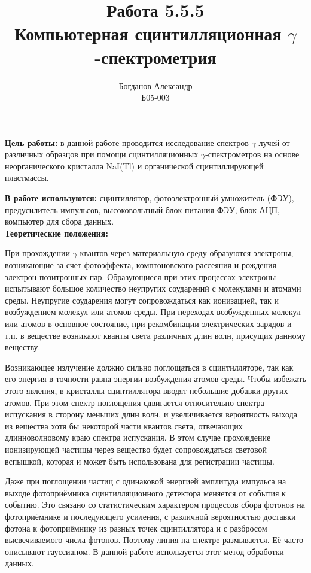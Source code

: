 \documentclass[a4paper, 12pt]{article}%
\author{Богданов Александр \\
	Б05-003}
\title{\textbf{Работа 5.5.5 \\ 
		Компьютерная сцинтилляционная $\gamma$-спектрометрия}}
\begin{document}
\maketitle

\textbf{Цель работы:} в данной работе проводится исследование спектров $\gamma$-лучей от различных образцов при помощи сцинтилляционных $\gamma$-спектрометров на основе неорганического кристалла NaI(Tl) и органической сцинтиллирующей пластмассы. 

\textbf{В работе используются:} сцинтиллятор,  фотоэлектронный умножитель (ФЭУ), предусилитель импульсов,  высоковольтный блок питания ФЭУ,  блок АЦП,  компьютер для сбора данных.\\

\textbf{Теоретические положения:}\\\par

	При прохождении $\gamma$-квантов через материальную среду образуются электроны,  возникающие за счет фотоэффекта,  комптоновского рассеяния и рождения электрон-позитронных пар.  Образующиеся при этих процессах электроны испытывают большое количество неупругих соударений с молекулами и атомами среды.  Неупругие соударения могут сопровождаться как ионизацией,  так и возбуждением молекул или атомов среды.  При переходах возбужденных молекул или атомов в основное состояние, при рекомбинации электрических зарядов и т.п.  в веществе возникают кванты света различных длин волн,  присущих данному веществу. 

	Возникающее излучение должно сильно поглощаться в сцинтилляторе,  так как его энергия в точности равна энергии возбуждения атомов среды.  Чтобы избежать этого явления,  в кристаллы сцинтиллятора вводят небольшие добавки других атомов.  При этом спектр поглощения сдвигается относительно спектра испускания в сторону меньших длин волн,  и увеличивается вероятность выхода из вещества хотя бы некоторой части квантов света,  отвечающих длинноволновому краю спектра испускания.  В этом случае прохождение ионизирующей частицы через вещество будет сопровождаться световой вспышкой,  которая и может быть использована для регистрации частицы. 

	Даже при поглощении частиц с одинаковой энергией амплитуда импульса на выходе фотоприёмника сцинтилляционного детектора меняется от события к событию.  Это связано со статистическим характером процессов сбора фотонов на фотоприёмнике и последующего усиления,  с различной вероятностью доставки фотона к фотоприёмнику из разных точек сцинтиллятора и с разбросом высвечиваемого числа фотонов.  Поэтому линия на спектре размывается.  Её часто описывают гауссианом.  В данной работе используется этот метод обработки данных. \\
\end{document}
